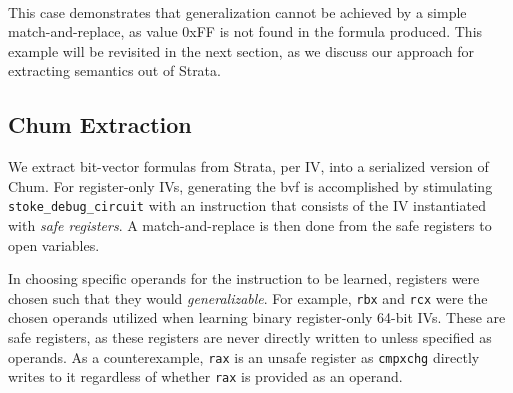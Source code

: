 \begin{enumerate}
\[\begin{array}{lcl}
\end{array}
\]
This case demonstrates that generalization cannot be achieved by a simple match-and-replace, as value 0xFF is not found in the formula produced.
This example will be revisited in the next section, as we discuss our approach for extracting semantics out of Strata.
\end{enumerate}

\subsection{Chum Extraction}\label{subsec:chumextraction}

We extract bit-vector formulas from Strata, per IV, into a serialized version of Chum. %
For register-only IVs, generating the bvf is accomplished by stimulating \texttt{stoke\_debug\_circuit} with an instruction that consists of the IV instantiated with \emph{safe registers}.
A match-and-replace is then done from the safe registers to open variables.

In choosing specific operands for the instruction to be learned, registers were chosen such that they would \emph{generalizable}. 
For example, \texttt{rbx} and \texttt{rcx} were the chosen operands utilized when learning binary register-only 64-bit IVs. 
These are safe registers, as these registers are never directly written to unless specified as operands. 
As a counterexample, \texttt{rax} is an unsafe register as \texttt{cmpxchg} directly writes to it regardless of whether \texttt{rax} is provided as an operand.

